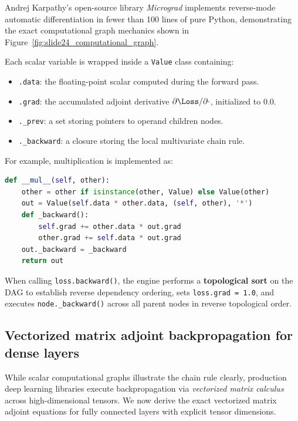 \documentclass[../../main.tex]{subfiles}
\begin{document}
\begin{deepdive}
Andrej Karpathy's open-source library \emph{Micrograd} implements reverse-mode automatic differentiation in fewer than 100 lines of pure Python, demonstrating the exact computational graph mechanics shown in Figure~\ref{fig:slide24_computational_graph}.

Each scalar variable is wrapped inside a \texttt{Value} class containing:
\begin{itemize}
    \item \texttt{.data}: the floating-point scalar computed during the forward pass.
    \item \texttt{.grad}: the accumulated adjoint derivative $\partial \Loss / \partial \cdot$, initialized to $0.0$.
    \item \texttt{.\_prev}: a set storing pointers to operand children nodes.
    \item \texttt{.\_backward}: a closure storing the local multivariate chain rule.
\end{itemize}
For example, multiplication is implemented as:
\begin{lstlisting}[language=Python]
def __mul__(self, other):
    other = other if isinstance(other, Value) else Value(other)
    out = Value(self.data * other.data, (self, other), '*')
    def _backward():
        self.grad += other.data * out.grad
        other.grad += self.data * out.grad
    out._backward = _backward
    return out
\end{lstlisting}
When calling \texttt{loss.backward()}, the engine performs a \textbf{topological sort} on the DAG to establish reverse dependency ordering, sets \texttt{loss.grad = 1.0}, and executes \texttt{node.\_backward()} across all parent nodes in reverse topological order.
\end{deepdive}

\subsection{Vectorized matrix adjoint backpropagation for dense layers}
\label{subsec:vectorized_backprop}

While scalar computational graphs illustrate the chain rule clearly, production deep learning libraries execute backpropagation via \emph{vectorized matrix calculus} across high-dimensional tensors. We now derive the exact vectorized matrix adjoint equations for fully connected layers with explicit tensor dimensions.
\end{document}

